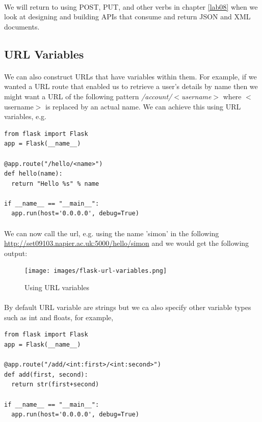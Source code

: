 \documentclass[12pt, a4paper, oneside]{book}
\begin{document}
\paragraph{} We will return to using POST, PUT, and other verbs in chapter \ref{lab08} when we look at designing and building APIs that consume and return JSON and XML documents.


\subsection{URL Variables}
\label{url-variables}
\paragraph{} We can also construct URLs that have variables within them. For example, if we wanted a URL route that enabled us to retrieve a user's details by name then we might want a URL of the following pattern \emph{/account/$<$username$>$} where $<$username$>$ is replaced by an actual name. We can achieve this using URL variables, e.g.

\begin{lstlisting}
from flask import Flask
app = Flask(__name__)

@app.route("/hello/<name>")
def hello(name):
  return "Hello %s" % name

if __name__ == "__main__":
  app.run(host='0.0.0.0', debug=True)
\end{lstlisting}

\paragraph{} We can now call the url, e.g. using the name 'simon' in the following \url{http://set09103.napier.ac.uk:5000/hello/simon} and we would get the following output:

\begin{figure}[H]
\centering
\texttt{[image: images/flask-url-variables.png]}
\caption{Using URL variables}
\label{fig:flask-url-variables}
\end{figure}

\paragraph{} By default URL variable are strings but we ca also specify other variable types such as int and floats, for example,

\begin{lstlisting}
from flask import Flask
app = Flask(__name__)

@app.route("/add/<int:first>/<int:second>")
def add(first, second):
  return str(first+second)

if __name__ == "__main__":
  app.run(host='0.0.0.0', debug=True)
\end{lstlisting}
\end{document}
